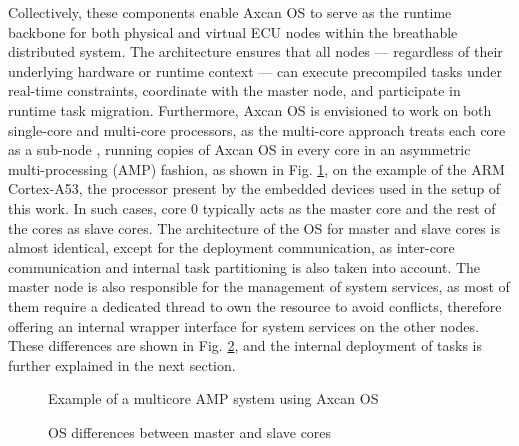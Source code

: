 Collectively, these components enable Axcan OS to serve as the runtime backbone for both physical and virtual ECU nodes within the breathable distributed system. The architecture ensures that all nodes — regardless of their underlying hardware or runtime context — can execute precompiled tasks under real-time constraints, coordinate with the master node, and participate in runtime task migration. Furthermore, Axcan OS is envisioned to work on both single-core and multi-core processors, as the multi-core approach treats each core as a sub-node , running copies of Axcan OS in every core in an asymmetric multi-processing (AMP) fashion, as shown in Fig. \ref{fig:multicore_example}, on the example of the ARM Cortex-A53, the processor present by the embedded devices used in the setup of this work. In such cases, core 0 typically acts as the master core and the rest of the cores as slave cores. The architecture of the OS for master and slave cores is almost identical, except for the deployment communication, as inter-core communication and internal task partitioning is also taken into account. The master node is also responsible for the management of system services, as most of them require a dedicated thread to own the resource to avoid conflicts, therefore offering an internal wrapper interface for system services on the other nodes. These differences are shown in Fig. \ref{fig:multicore_deployment_arch}, and the internal deployment of tasks is further explained in the next section.

\begin{figure}
	\centering
	
	\caption{Example of a multicore AMP system using Axcan OS}
	\label{fig:multicore_example}
\end{figure}

\begin{figure}
	\centering
	
	\caption{OS differences between master and slave cores}
	\label{fig:multicore_deployment_arch}
\end{figure}

